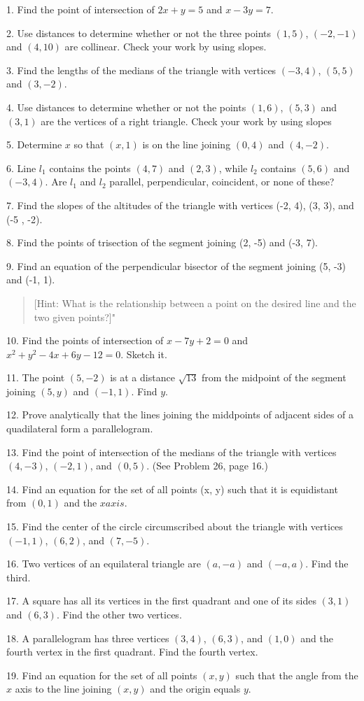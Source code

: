 \documentclass[10pt,letterpaper]{article}
\begin{document}
1.	Find the point of intersection of $2x + y = 5$ and $x - 3y = 7$.

2.	Use distances to determine whether or not the three points $(1, 5)$, $(-2, -1)$ and $(4, 10)$ are collinear. Check your work by using slopes.

3.	Find the lengths of the medians of the triangle with vertices $(-3, 4)$, $(5, 5)$ and $(3, -2)$.

4.	Use distances to determine whether or not the points $(1, 6)$, $(5, 3)$ and $(3, 1)$ are the vertices of a right triangle. Check your work by using slopes

5.	Determine $x$ so that $(x, 1)$ is on the line joining $(0, 4)$ and $(4, -2)$.

6.	Line $l_1$ contains the points $(4, 7)$ and $(2, 3)$, while $l_2$ contains $(5, 6)$ and $(-3, 4)$. Are $l_1$ and $l_2$ parallel, perpendicular, coincident, or none of these?

7.	Find the slopes of the altitudes of the triangle with vertices (-2, 4), (3, 3), and (-5 , -2).

8.	Find the points of trisection of the segment joining (2, -5) and (-3, 7).

9.	Find an equation of the perpendicular bisector of the segment joining (5, -3) and (-1, 1).
\begin{quote}
[Hint: What is the relationship between a point on the desired line and the two given points?]"
\end{quote}

10.	Find the points of intersection of $x - 7y + 2 = 0$ and $x^2 + y^2 - 4x + 6y - 12 = 0$. Sketch it.

11.	The point $(5, -2)$ is at a distance $\sqrt{13}$ from the midpoint of the segment joining $(5, y)$ and $(-1, 1)$. Find $y$.

12.	Prove analytically that the lines joining the middpoints of adjacent sides of a quadilateral form a parallelogram.

13.	Find the point of intersection of the medians of the triangle with vertices $(4, -3)$, $(-2, 1)$, and $(0, 5)$. (See Problem 26, page 16.)

14.	Find an equation for the set of all points (x, y) such that it is equidistant from $(0, 1)$ and the $x axis$.

15.	Find the center of the circle circumscribed about the triangle with vertices $(-1, 1)$, $(6, 2)$, and $(7, -5)$.

16.	Two vertices of an equilateral triangle are $(a, -a)$ and $(-a, a)$. Find the third.

17.	A square has all its vertices in the first quadrant and one of its sides $(3, 1)$ and $(6, 3)$. Find the other two vertices.

18.	A parallelogram has three vertices $(3, 4)$, $(6,3)$, and $(1, 0)$ and the fourth vertex in the first quadrant. Find the fourth vertex.

19.	Find an equation for the set of all points $(x, y)$ such that the angle from the $x$ axis to the line joining $(x, y)$ and the origin equals $y$.
\end{document}
